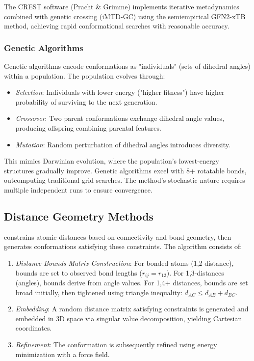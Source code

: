 \documentclass[12pt]{article}
\begin{document}
The CREST software (Pracht \& Grimme) implements iterative metadynamics combined with genetic crossing (iMTD-GC) using the semiempirical GFN2-xTB method, achieving rapid conformational searches with reasonable accuracy.

\subsubsection{Genetic Algorithms}

Genetic algorithms encode conformations as "individuals" (sets of dihedral angles) within a population. The population evolves through:

\begin{itemize}
\item \textit{Selection}: Individuals with lower energy ("higher fitness") have higher probability of surviving to the next generation.
\item \textit{Crossover}: Two parent conformations exchange dihedral angle values, producing offspring combining parental features.
\item \textit{Mutation}: Random perturbation of dihedral angles introduces diversity.
\end{itemize}

This mimics Darwinian evolution, where the population's lowest-energy structures gradually improve. Genetic algorithms excel with 8+ rotatable bonds, outcomputing traditional grid searches. The method's stochastic nature requires multiple independent runs to ensure convergence.

\subsection{Distance Geometry Methods}

\DG constrains atomic distances based on connectivity and bond geometry, then generates conformations satisfying these constraints. The algorithm consists of:

\begin{enumerate}
\item \textit{Distance Bounds Matrix Construction}: For bonded atoms (1,2-distance), bounds are set to observed bond lengths (\(r_{ij} = r_{12}\)). For 1,3-distances (angles), bounds derive from angle values. For 1,4+ distances, bounds are set broad initially, then tightened using triangle inequality: \(d_{AC} \leq d_{AB} + d_{BC}\).

\item \textit{Embedding}: A random distance matrix satisfying constraints is generated and embedded in 3D space via singular value decomposition, yielding Cartesian coordinates.

\item \textit{Refinement}: The conformation is subsequently refined using energy minimization with a force field.
\end{enumerate}
\end{document}
